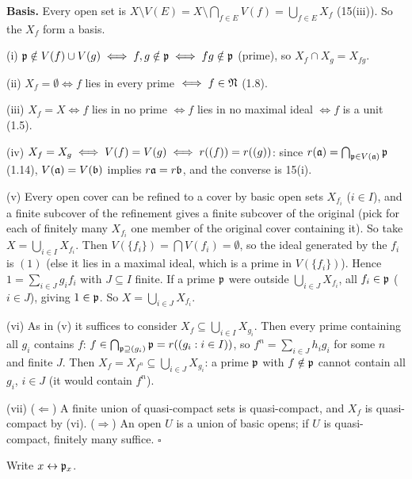 \documentclass[11pt]{article}
\begin{document}
\textbf{Basis.} Every open set is $X\setminus V(E)=X\setminus\bigcap_{f\in E}V(f)=\bigcup_{f\in E}X_f$ (15(iii)). So the $X_f$ form a basis.

(i) $\mathfrak p\notin V(f)\cup V(g)\iff f,g\notin\mathfrak p\iff fg\notin\mathfrak p$ (prime), so $X_f\cap X_g=X_{fg}$.

(ii) $X_f=\emptyset\iff f$ lies in every prime $\iff f\in\mathfrak N$ (1.8).

(iii) $X_f=X\iff f$ lies in no prime $\iff f$ lies in no maximal ideal $\iff f$ is a unit (1.5).

(iv) $X_f=X_g\iff V(f)=V(g)\iff r((f))=r((g))$: since $r(\mathfrak a)=\bigcap_{\mathfrak p\in V(\mathfrak a)}\mathfrak p$ (1.14), $V(\mathfrak a)=V(\mathfrak b)$ implies $r\mathfrak a=r\mathfrak b$, and the converse is 15(i).

(v) Every open cover can be refined to a cover by basic open sets $X_{f_i}$ ($i\in I$), and a finite subcover of the refinement gives a finite subcover of the original (pick for each of finitely many $X_{f_i}$ one member of the original cover containing it). So take $X=\bigcup_{i\in I}X_{f_i}$. Then $V(\{f_i\})=\bigcap V(f_i)=\emptyset$, so the ideal generated by the $f_i$ is $(1)$ (else it lies in a maximal ideal, which is a prime in $V(\{f_i\})$). Hence $1=\sum_{i\in J}g_if_i$ with $J\subseteq I$ finite. If a prime $\mathfrak p$ were outside $\bigcup_{i\in J}X_{f_i}$, all $f_i\in\mathfrak p$ ($i\in J$), giving $1\in\mathfrak p$. So $X=\bigcup_{i\in J}X_{f_i}$.

(vi) As in (v) it suffices to consider $X_f\subseteq\bigcup_{i\in I}X_{g_i}$. Then every prime containing all $g_i$ contains $f$: $f\in\bigcap_{\mathfrak p\supseteq(g_i)}\mathfrak p=r((g_i:i\in I))$, so $f^n=\sum_{i\in J}h_ig_i$ for some $n$ and finite $J$. Then $X_f=X_{f^n}\subseteq\bigcup_{i\in J}X_{g_i}$: a prime $\mathfrak p$ with $f\notin\mathfrak p$ cannot contain all $g_i$, $i\in J$ (it would contain $f^n$).

(vii) ($\Leftarrow$) A finite union of quasi-compact sets is quasi-compact, and $X_f$ is quasi-compact by (vi). ($\Rightarrow$) An open $U$ is a union of basic opens; if $U$ is quasi-compact, finitely many suffice. \hfill$\square$

\pf
Write $x\leftrightarrow\mathfrak p_x$.
\end{document}
